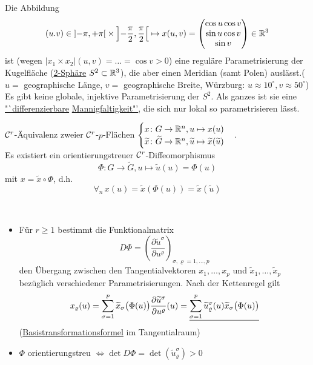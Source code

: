 \begin{bsp}
Die Abbildung 
\[\left( u.v \right) \in \left]-\pi , + \pi \right[ \times \left]-\frac{\pi}{2}, \frac{\pi}{2} \right[ \mapsto x (u, v) = \begin{pmatrix}
                                                                                                                \cos u \cos v\\
														  \sin u \cos v\\
														   \sin v
                                                                                                               \end{pmatrix} \in \mathbb{R}^3
\] 
ist (wegen \(|x_1 \times x_2|(u,v) = \ldots = \cos v > 0\)) eine reguläre Parametrisierung der Kugelfläche (\uline{2-Sphäre} \(S^2 \subset \mathbb{R}^3\)), die aber einen Meridian (samt Polen) auslässt.(\(u =\) geographische Länge, \(v=\) geographische Breite, Würzburg: \(u \approx 10^\circ, v \approx 50^\circ\))\\
Es gibt keine globale, injektive Parametrisierung der \(S^2\). Als ganzes ist sie eine \underline{"`differenzierbare} \underline{Mannigfaltigkeit"'}, die sich nur lokal so parametrisieren lässt.
\end{bsp}

\begin{definition}[\(\C^r\)-Äquivalenz]
\(\C^r\)-Äquivalenz zweier \(\C^r\)-\(p\)-Flächen
\(\begin{cases}
x \colon G \rightarrow \mathbb{R}^n, u \mapsto x(u)\\
\widetilde x \colon \widetilde G \rightarrow \mathbb{R}^n, \widetilde u \mapsto \widetilde x( \widetilde u)
\end{cases}\). \\
Es existiert ein orientierungstreuer \(\C^r\)-Diffeomorphismus 
\[\Phi \colon  G \rightarrow \widetilde G, u \mapsto \widetilde u (u) = \Phi (u)\] 
mit \(x = \widetilde x \circ \Phi\), d.h. 
\[\forall_{n} \, x(u) = \widetilde x (\Phi(u)) = \widetilde x (\widetilde u)\]
\end{definition}

\begin{bemerkung} \(\)
\begin{itemize}
 \item Für \(r \geq 1\) bestimmt die Funktionalmatrix 
 \[D\Phi = \left( \frac{\partial \widetilde u^\sigma}{\partial u^\varrho}\right)_{\sigma, \varrho = 1, \dots , p}\] 
 den Übergang zwischen den Tangentialvektoren \(x_1, \dots , x_p\) und \(\widetilde x_1, \dots , \widetilde x_p\) bezüglich verschiedener Parametrisierungen. Nach der Kettenregel gilt
\[
 x_{\varrho}(u) = \sum_{\sigma = 1}^{p} \widetilde x_\sigma \big(\Phi(u)\big) \frac{\partial \widetilde u^\sigma}{\partial u^\varrho} (u) = \uline{\sum_{\sigma = 1}^{p} \widetilde u_\varrho^\sigma (u) \widetilde x_\sigma \big(\Phi(u)\big)}
\]
(\uline{Basistransformationsformel} im Tangentialraum)
 \item \(\Phi\) orientierungstreu \(\Leftrightarrow \det D\Phi = \det \left(\widetilde u_\varrho^\sigma\right) > 0\)
\end{itemize}
\end{bemerkung}

